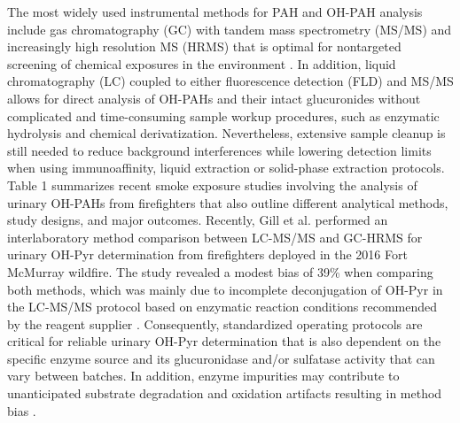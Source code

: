 \documentclass[preprint, 3p,
authoryear]{elsarticle} %
\begin{document}
The most widely used instrumental methods for PAH and OH-PAH analysis
include gas chromatography (GC) with tandem mass spectrometry (MS/MS)
and increasingly high resolution MS (HRMS) that is optimal for
nontargeted screening of chemical exposures in the environment
\citep{34}. In addition, liquid chromatography (LC) coupled to either
fluorescence detection (FLD) and MS/MS allows for direct analysis of
OH-PAHs and their intact glucuronides without complicated and
time-consuming sample workup procedures, such as enzymatic hydrolysis
and chemical derivatization. Nevertheless, extensive sample cleanup is
still needed to reduce background interferences while lowering detection
limits when using immunoaffinity, liquid extraction or solid-phase
extraction protocols. Table 1 summarizes recent smoke exposure studies
involving the analysis of urinary OH-PAHs from firefighters that also
outline different analytical methods, study designs, and major outcomes.
Recently, Gill et al. \citep{30} performed an interlaboratory method
comparison between LC-MS/MS and GC-HRMS for urinary OH-Pyr determination
from firefighters deployed in the 2016 Fort McMurray wildfire. The study
revealed a modest bias of 39\% when comparing both methods, which was
mainly due to incomplete deconjugation of OH-Pyr in the LC-MS/MS
protocol based on enzymatic reaction conditions recommended by the
reagent supplier \citep{30}. Consequently, standardized operating
protocols are critical for reliable urinary OH-Pyr determination that is
also dependent on the specific enzyme source and its glucuronidase
and/or sulfatase activity that can vary between batches. In addition,
enzyme impurities may contribute to unanticipated substrate degradation
and oxidation artifacts resulting in method bias \citep{35}.
\end{document}
